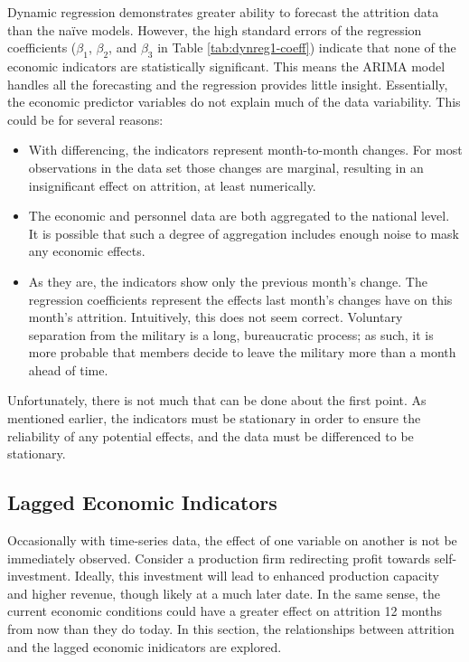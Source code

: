 \documentclass[12pt,letterpaper,toc=flat,oneside]{report}
\theoremstyle{definition}
\theoremstyle{definition}
\theoremstyle{definition}
\theoremstyle{remark}
\begin{document}
Dynamic regression demonstrates greater ability to forecast the
attrition data than the naïve models. However, the high standard errors
of the regression coefficients (\(\beta_1\), \(\beta_2\), and
\(\beta_3\) in Table \ref{tab:dynreg1-coeff}) indicate that none of the
economic indicators are statistically significant. This means the ARIMA
model handles all the forecasting and the regression provides little
insight. Essentially, the economic predictor variables do not explain
much of the data variability. This could be for several reasons:

\begin{itemize}
\item
  With differencing, the indicators represent month-to-month changes.
  For most observations in the data set those changes are marginal,
  resulting in an insignificant effect on attrition, at least
  numerically.
\item
  The economic and personnel data are both aggregated to the national
  level. It is possible that such a degree of aggregation includes
  enough noise to mask any economic effects.
\item
  As they are, the indicators show only the previous month's change. The
  regression coefficients represent the effects last month's changes
  have on this month's attrition. Intuitively, this does not seem
  correct. Voluntary separation from the military is a long,
  bureaucratic process; as such, it is more probable that members decide
  to leave the military more than a month ahead of time.
\end{itemize}

Unfortunately, there is not much that can be done about the first point.
As mentioned earlier, the indicators must be stationary in order to
ensure the reliability of any potential effects, and the data must be
differenced to be stationary.

\hypertarget{lagged-economic-indicators}{%
\subsection{Lagged Economic
Indicators}\label{lagged-economic-indicators}}

Occasionally with time-series data, the effect of one variable on
another is not be immediately observed. Consider a production firm
redirecting profit towards self-investment. Ideally, this investment
will lead to enhanced production capacity and higher revenue, though
likely at a much later date. In the same sense, the current economic
conditions could have a greater effect on attrition 12 months from now
than they do today. In this section, the relationships between attrition
and the lagged economic inidicators are explored.
\end{document}
